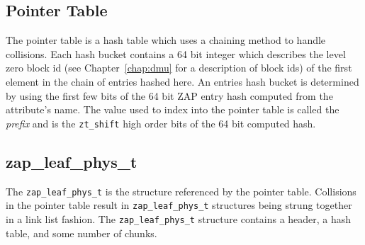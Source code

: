 \subsection{Pointer Table}

The pointer table is a hash table which uses a chaining method to handle collisions.
Each hash bucket contains a 64 bit integer which describes
the level zero block id
(see Chapter~\ref{chap:dmu} for a description of block ids)
of the first element in the chain of entries hashed here.
An entries hash bucket is determined by
using the first few bits of the 64 bit ZAP entry hash
computed from the attribute's name.
The value used to index into the pointer table is called
the \emph{prefix} and is the \lstinline{zt_shift} high order bits of the 64 bit computed hash.

\subsection{zap\_leaf\_phys\_t}

The \lstinline{zap_leaf_phys_t} is the structure
referenced by the pointer table.
Collisions in the pointer table result in \lstinline{zap_leaf_phys_t} structures
being strung together in a link list fashion.
The \lstinline{zap_leaf_phys_t} structure contains
a header, a hash table, and some number of chunks.

